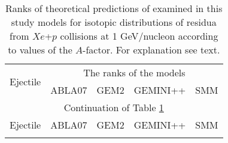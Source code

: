      \begin{longtable}[c]{| c || c |c|c|c|}
     \caption{Ranks of theoretical predictions  of examined in this study models for isotopic distributions
of residua from $Xe$+$p$ collisions at 1 GeV/nucleon \cite{napolitani2007measurement}
according to values of the $A$-factor. For explanation see text. \label{ranktable_long}}\\
     \hline
    \multirow{2}{4em}{Ejectile} &\multicolumn{4}{|c|}{The ranks of the models}\\
    \cline{2-5}
    & ABLA07& GEM2& GEMINI++& SMM\\
    \hline
    \hline
    \endfirsthead
    \hline
 \multicolumn{5}{|c|}{Continuation of Table \ref{ranktable_long}}\\
 \hline
 Ejectile & ABLA07& GEM2& GEMINI++& SMM\\
 \hline
 \hline
    \endhead
\hline
 \endfoot


\end{longtable}
